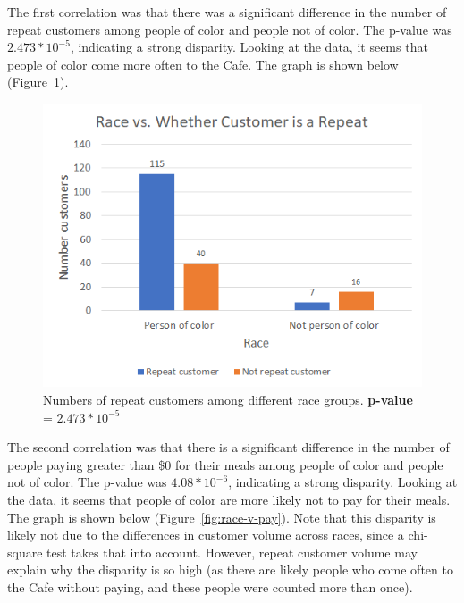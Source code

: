 The first correlation was that there was a significant difference in the number of repeat customers among people of color and people not of color. The p-value was \(2.473 * 10^{-5}\), indicating a strong disparity. Looking at the data, it seems that people of color come more often to the Cafe. The graph is shown below (Figure~\ref{fig:race-v-repeat}).

\begin{figure}[H]
    \centering \includegraphics*[scale=.5]{assets/race-v-repeat.png}
    
    \caption{Numbers of repeat customers among different race groups.
    \textbf{p-value} = \(2.473 * 10^{-5}\)}\label{fig:race-v-repeat}
\end{figure}

The second correlation was that there is a significant difference in the number of people paying greater than \$0 for their meals among people of color and people not of color. The p-value was \(4.08 * 10^{-6}\), indicating a strong disparity. Looking at the data, it seems that people of color are more likely not to pay for their meals. The graph is shown below (Figure~\ref{fig:race-v-pay}). Note that this disparity is likely not due to the differences in customer volume across races, since a chi-square test takes that into account. However, repeat customer volume may explain why the disparity is so high (as there are likely people who come often to the Cafe without paying, and these people were counted more than once).

